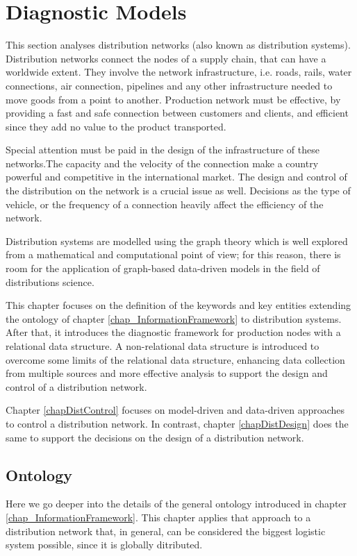 \chapter{Diagnostic Models}
This section analyses distribution networks (also known as distribution systems). Distribution networks connect the nodes of a supply chain, that can have a worldwide extent. They involve the network infrastructure, i.e. roads, rails, water connections, air connection, pipelines and any other infrastructure needed to move goods from a point to another. Production network must be effective, by providing a fast and safe connection between customers and clients, and efficient since they add no value to the product transported.\par

Special attention must be paid in the design of the infrastructure of these networks.The capacity and the velocity of the connection make a country powerful and competitive in the international market.  The design and control of the distribution on the network is a crucial issue as well. Decisions as the type of vehicle, or the frequency of a connection heavily affect the efficiency of the network.\par

Distribution systems are modelled using the graph theory which is well explored from a mathematical and computational point of view; for this reason, there is room for the application of graph-based data-driven models in the field of distributions science.\par

This chapter focuses on the definition of the keywords and key entities extending the ontology of chapter \ref{chap_InformationFramework} to distribution systems. After that, it introduces the diagnostic framework for production nodes with a relational data structure. A non-relational data structure is introduced to overcome some limits of the relational data structure, enhancing data collection from multiple sources and more effective analysis to support the design and control of a distribution network.\par

Chapter \ref{chapDistControl} focuses on model-driven and data-driven approaches to control a distribution network. In contrast, chapter \ref{chapDistDesign} does the same to support the decisions on the design of a distribution network.

\section{Ontology} \label{secOntologyDistribution}
Here we go deeper into the details of the general ontology introduced in chapter \ref{chap_InformationFramework}. This chapter applies that approach to a distribution network that, in general, can be considered the biggest logistic system possible, since it is globally ditributed. 

